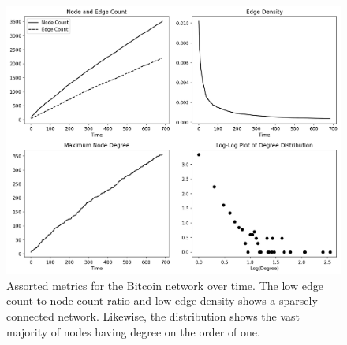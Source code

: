\documentclass[a4paper,11pt]{article}
\begin{document}
\begin{figure}[h!]
\centering
\includegraphics[width=1.\linewidth]{Images/Bitcoin/graph_data.png}
\caption{Assorted metrics for the Bitcoin network over time.  The low edge count to node count ratio and low edge density shows a sparsely connected network.  Likewise, the distribution shows the vast majority of nodes having degree on the order of one.}
\label{fig:metricsbitcoin}
\end{figure}
\end{document}
